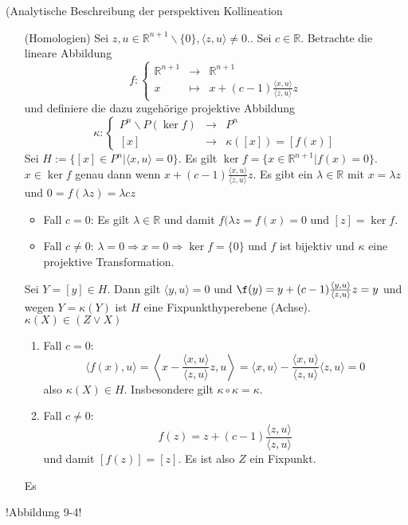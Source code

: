 \documentclass[11pt]{article}
\begin{document}
\begin{example}(Analytische Beschreibung der perspektiven Kollineation
\begin{enumerate}
    \item[(Homologien)] Sei $z, u\in \mathbb R^{n+1}\backslash \{0\}, \langle z,u\rangle\neq 0$.. Sei $c\in \mathbb R$. Betrachte die lineare Abbildung
    \begin{equation*}
    f: \left\{
    \begin{array}{ccc}
         \mathbb R^{n+1}& \to &\mathbb R^{n+1} \\
         x&\mapsto &x+(c-1)\frac{\langle x, u\rangle}{\langle z,u\rangle}z
    \end{array}\right.
    \end{equation*} und definiere die dazu zugehörige projektive Abbildung 
    \begin{equation*}
        \kappa: \left\{
        \begin{array}{ccc}
             P^n\backslash P(\ker f)&\to&P^n\\
             {[x]}&\to &\kappa([x]) = [f(x)] 
        \end{array}\right.
    \end{equation*}
    Sei $H:= \{[x]\in P^n|\langle x,u\rangle = 0\}$. Es gilt $\ker f = \{x\in \mathbb R^{n+1}|f(x) = 0\}$. $x\in \ker f$ genau dann wenn $x+(c-1)\frac{\langle x, u\rangle}{\langle z,u\rangle}z$. Es gibt ein $\lambda\in \mathbb R$ mit $x = \lambda z$ und $0 = f(\lambda z) = \lambda c z$
    \begin{itemize}
        \item Fall $c = 0$: Es gilt $\lambda\in \mathbb R$ und damit $f(\lambda z = f(x) = 0$ und $[z] = \ker f$.
        \item Fall $c \neq 0$: $\lambda = 0\Rightarrow x = 0\Rightarrow \ker f = \{0\}$ und $f$ ist bijektiv und $\kappa$ eine projektive Transformation. 
    \end{itemize}
    Sei $Y = [y] \in H$. Dann gilt $\langle y, u\rangle = 0$ und $\f(y) = y+ (c-1)\frac{\langle y, u\rangle}{\langle z, u\rangle}z = y$ und wegen $Y = \kappa(Y)$ ist $H$ eine Fixpunkthyperebene (Achse).\\
    $\kappa(X)\in (Z\lor X)$
    \begin{enumerate}
        \item Fall $c=0$: \begin{equation*}
            \langle f(x), u\rangle = \left\langle x- \frac{\langle x, u\rangle}{\langle z,u\rangle}z, u \right\rangle= \langle x,u\rangle - \frac{\langle x, u\rangle}{\langle z,u\rangle}\langle z,u\rangle = 0
        \end{equation*}
        also $\kappa (X) \in H$. Insbesondere gilt $\kappa\circ \kappa = \kappa$.
        \item Fall $c\neq 0$:
            \begin{equation*}
                f(z) = z+(c-1)\frac{\langle z, u\rangle}{\langle z, u\rangle}
            \end{equation*} und damit $[f(z)] = [z]$. Es ist also $Z$ ein Fixpunkt.
            \end{enumerate}
    Es 
\end{enumerate}
!Abbildung 9-4!
\end{example}
\end{document}
